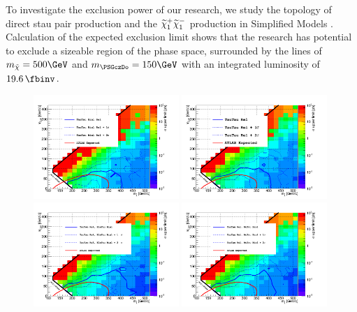 To investigate the exclusion power of our research, we study the topology of direct stau pair production and  the $\widetilde{\chi}_{1}^{+}\widetilde{\chi}_{1}^{-}$ production in Simplified Models \cite{alves:sms}. 
Calculation of the expected exclusion limit shows that  
the research has potential to exclude 
a sizeable region of the phase space, surrounded by the lines of $m_{\tilde{\chi}} = 500\GeV$ and $m_{\PSGczDo} = 150\GeV$ with an integrated luminosity of $19.6\,\fbinv$.


\begin{linenomath}
\begin{figure}[h]
\centering
\includegraphics[width=0.49\textwidth,keepaspectratio=true]{StatisticsFig/NewFigs/TauTau_Bin1Rel.png}
\includegraphics[width=0.49\textwidth,keepaspectratio=true]{StatisticsFig/NewFigs/TauTau_Bin1Rel_Bin2.png}
\includegraphics[width=0.49\textwidth,keepaspectratio=true]{StatisticsFig/NewFigs/TauTau_EleTauBin1.png}
\includegraphics[width=0.49\textwidth,keepaspectratio=true]{StatisticsFig/NewFigs/TauTau_MuTauBin1.png}
\caption{}
\label{fig:limit_bins}
\end{figure}
\end{linenomath}

